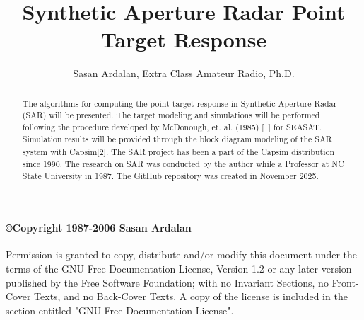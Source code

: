 \title {Synthetic Aperture Radar Point Target Response}
\author{Sasan Ardalan, Extra Class Amateur Radio, Ph.D.}
\date{}






\thispagestyle{empty}
\maketitle
\thispagestyle{empty} %

\begin{abstract}
 
The algorithms for computing the  point target response in Synthetic Aperture Radar (SAR) will be presented. The target modeling and simulations will be performed following the procedure developed by McDonough, et. al. (1985) [1] for SEASAT. Simulation results will be provided through the block diagram modeling   of the SAR system with Capsim\textsuperscript{\textregistered}[2]. The SAR project has been a part of the Capsim\textsuperscript{\textregistered} distribution since 1990. The research on SAR was conducted  by the author while a Professor at NC State University in 1987. The GitHub repository was created in November 2025.

\end{abstract}
\paragraph{\copyright{Copyright  1987-2006 Sasan Ardalan}}



Permission is granted to copy, distribute and/or modify this
document under the terms of the GNU Free Documentation License,
Version 1.2 or any later version published by the Free Software
Foundation; with no Invariant Sections, no Front-Cover Texts, and
no Back-Cover Texts. A copy of the license is included in the
section entitled "GNU Free Documentation License".


\pagebreak

 
 \setcounter{tocdepth}{2}
 \tableofcontents
 \pagebreak
 
\listoffigures


\pagebreak


